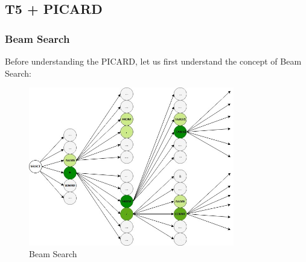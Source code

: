 \clearpage
\subsection{T5 + PICARD} \label{picard}




\subsubsection{Beam Search}
Before understanding the PICARD, let us first understand the concept of Beam Search:

\begin{figure}[h]
    \centering
    \includegraphics[width=0.8\textwidth]{pics/picard/beam.png}
    \caption{Beam Search}
    \label{fig:beam_search}
\end{figure}

